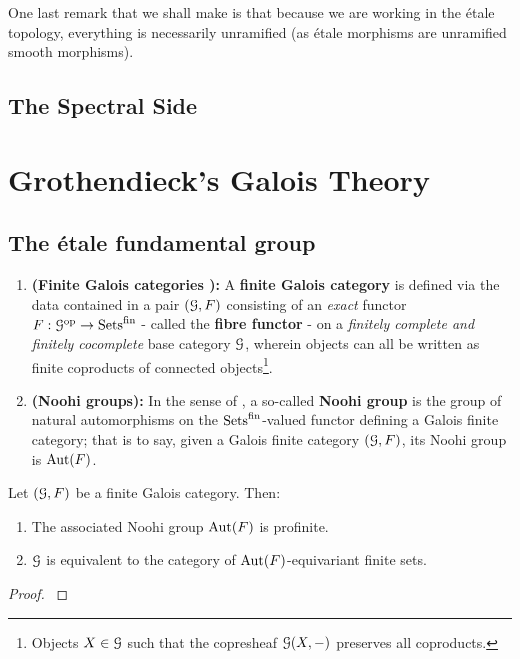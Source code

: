             One last remark that we shall make is that because we are working in the \'etale topology, everything is necessarily unramified (as \'etale morphisms are unramified smooth morphisms).
        
        \subsection{The Spectral Side}
    
    \section{Grothendieck's Galois Theory}
        \subsection{The \'etale fundamental group}
            \begin{definition} \label{def: finite_galois_categories}
                \noindent
                \begin{enumerate}
                    \item \textbf{(Finite Galois categories \cite[\href{https://stacks.math.columbia.edu/tag/0BMY}{Tag 0BMY}]{stacks}):} A \textbf{finite Galois category} is defined via the data contained in a pair $(\mathcal{G}, F)$ consisting of an \textit{exact} functor $F: \mathcal{G}^{\mathrm{op}} \to \mathrm{Sets}^{\mathrm{fin}}$ - called the \textbf{fibre functor} - on a \textit{finitely complete and finitely cocomplete} base category $\mathcal{G}$, wherein objects can all be written as finite coproducts of connected objects\footnote{Objects $X \in \mathcal{G}$ such that the copresheaf $\mathcal{G}(X, -)$ preserves all coproducts.}.
                    \item \textbf{(Noohi groups):} In the sense of \cite[Theorem 2.16]{noohi_fundamental_group}, a so-called \textbf{Noohi group} is the group of natural automorphisms on the $\mathrm{Sets}^{\mathrm{fin}}$-valued functor defining a Galois finite category; that is to say, given a Galois finite category $(\mathcal{G}, F)$, its Noohi group is $\mathrm{Aut}(F)$.  
                \end{enumerate}
            \end{definition}
            
            \begin{lemma} \label{lemma: profiniteness_of_noohi_groups}
                Let $(\mathcal{G}, F)$ be a finite Galois category. Then:
                    \begin{enumerate}
                        \item The associated Noohi group $\mathrm{Aut}(F)$ is profinite.
                        \item $\mathcal{G}$ is equivalent to the category of $\mathrm{Aut}(F)$-equivariant finite sets.
                    \end{enumerate}
            \end{lemma}
                \begin{proof}
                    \cite[Theorem 2.16]{noohi_fundamental_group}
                \end{proof}
            

